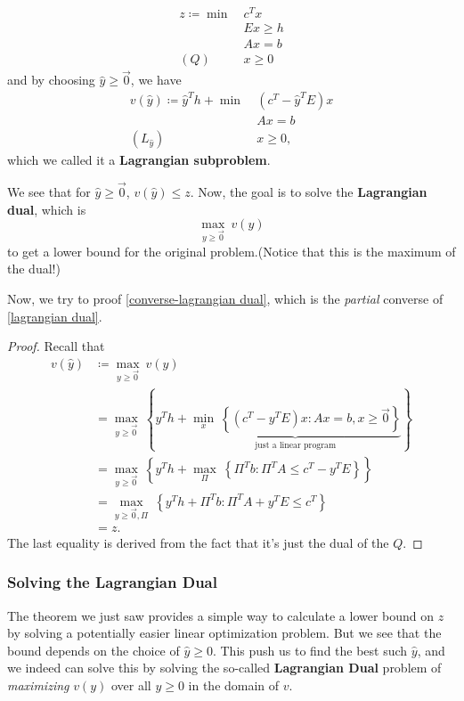 \begin{prev}
	\begin{align*}
		z\coloneqq \min~ & c^{T}x    \\
		                 & Ex \geq h \\
		                 & Ax = b    \\
		(Q)\quad         & x\geq 0
	\end{align*}
	and by choosing \(\hat{y}\geq \vec{0}\), we have
	\begin{align*}
		v(\hat{y})\coloneqq \hat{y}^{T}h + \min~ & (c^{T} - \hat{y}^{T}E)x \\
		                                         & Ax = b                  \\
		(L_{\hat{y}})\quad                       & x\geq 0,
	\end{align*}
	which we called it a \textbf{Lagrangian subproblem}.

	\begin{note}
		We see that for \(\hat{y}\geq \vec{0}\), \(v(\hat{y})\leq z\). Now, the goal is to solve the
		\textbf{Lagrangian dual}, which is
		\[
			\max_{y\geq \vec{0}}\ v(y)
		\]
		to get a lower bound for the original problem.(Notice that this is the maximum of the dual!)
	\end{note}
\end{prev}

Now, we try to proof \autoref{converse-lagrangian dual}, which is the \emph{partial} converse of \autoref{lagrangian dual}.
\begin{proof}
	Recall that
	\[
		\begin{split}
			v(\hat{y})&\coloneqq \max_{y\geq \vec{0}}\ v(y) \\
			&= \max_{y\geq \vec{0}}\ \left\{y^{T}h + \underbrace{\min_{x}\ \left\{(c^{T} - y^{T}E)x\colon Ax = b, x\geq \vec{0}\right\}}_{\text{just a linear program}}\right\}\\
			&= \max_{y\geq \vec{0}}\ \left\{y^{T}h + \max_{\Pi}\ \left\{\Pi^{T}b\colon \Pi^{T}A\leq c^{T} - y^{T}E\right\}\right\}\\
			&= \max_{y\geq \vec{0}, \Pi}\ \left\{y^{T}h + \Pi^{T}b\colon \Pi^{T}A + y^{T}E\leq c^{T}\right\}\\
			&= z.
		\end{split}
	\]
	The last equality is derived from the fact that it's just the dual of the \(Q\).
\end{proof}

\subsubsection{Solving the Lagrangian Dual}
The theorem we just saw provides a simple way to calculate a lower bound on \(z\) by solving a potentially easier linear optimization problem.
But we see that the bound depends on the choice of \(\hat{y}\geq 0\). This push us to find the best such \(\hat{y}\), and we indeed can solve
this by solving the so-called \textbf{Lagrangian Dual} problem of \emph{maximizing} \(v(y)\) over all \(y\geq 0\) in the domain of \(v\).

